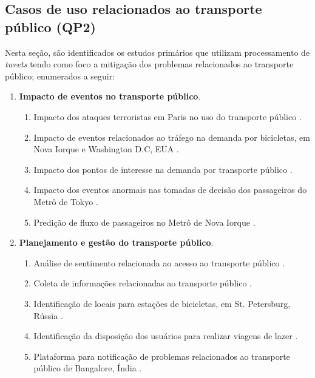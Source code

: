 \documentclass[
	12pt,				%
	oneside,			%
	a4paper,			%
	english,			%
	brazil				%
	]{abntex2ppgsi}
\begin{document}
\subsection{Casos de uso relacionados ao transporte público (QP2)}
Nesta seção, são identificados os estudos primários que utilizam processamento de \textit{tweets} tendo como foco a mitigação dos problemas relacionados ao transporte público; enumerados a seguir:
\begin{enumerate}
\item \textbf{Impacto de eventos no transporte público}.
\begin{enumerate}
\item Impacto dos ataques terroristas em Paris no uso do transporte público \cite{Wen2016}.
\item Impacto de eventos relacionados ao tráfego na demanda por bicicletas, em Nova Iorque e Washington D.C, EUA \cite{Chen2016}.
\item Impacto dos pontos de interesse na demanda por transporte público \cite{Maghrebi2015}.
\item Impacto dos eventos anormais nas tomadas de decisão dos passageiros do Metrô de Tokyo \cite{Itoh2016}.
\item Predição de fluxo de passageiros no Metrô de Nova Iorque \cite{Ni2016}.
\end{enumerate}

\item \textbf{Planejamento e gestão do transporte público}.
\begin{enumerate}
\item Análise de sentimento relacionada ao acesso ao transporte público \cite{Guo2016}.
\item Coleta de informações relacionadas ao transporte público \cite{Gal-Tzur2014}.
\item Identificação de locais para estações de bicicletas, em St. Petersburg, Rússia \cite{Gutev2016}.
\item Identificação da disposição dos usuários para realizar viagens de lazer \cite{Gkiotsalitis2016}.
\item Plataforma para notificação de problemas relacionados ao transporte público de Bangalore, Índia \cite{Mukherjee2015}.
\end{enumerate} 
\end{enumerate}
\end{document}
